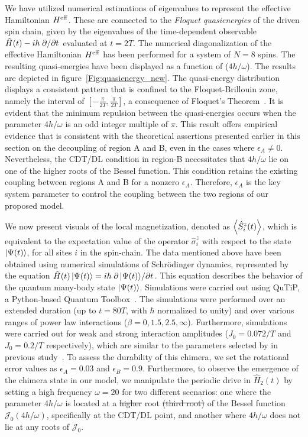 \documentclass[12pt]{iopart}
\begin{document}
We have utilized numerical estimations of eigenvalues to represent the effective Hamiltonian $H^{\rm eff}$. These are connected to the \textit{ Floquet quasienergies} of the driven spin chain, given by the eigenvalues of the time-dependent observable $\hat{H}(t)-i\hbar\pdv*{}{t}$ evaluated at $t=2T$. The numerical diagonalization of the effective Hamiltonian $H^{\rm eff}$ has been performed for a system of $N=8$ spins. The resulting quasi-energies have been displayed as a function of ($4h/\omega$). The results are depicted in figure~\ref{Fig:quasienergy_new}. The quasi-energy distribution displays a consistent pattern that is confined to the Floquet-Brillouin zone, namely the interval of $[-\frac{\pi}{2T}, \frac{\pi}{2T}]$, a consequence of Floquet's Theorem~\cite{dutta2014}. It is evident that the minimum repulsion between the quasi-energies occurs when the parameter $4h/\omega$ is an odd integer multiple of $\pi$. This result offers empirical evidence that is consistent with the theoretical assertions presented earlier in this section on the decoupling of region A and B, even in the cases where $\epsilon_A \neq 0$. Nevertheless, the CDT/DL condition in region-B necessitates that $4h/\omega$ lie on one of the higher roots of the Bessel function. This condition retains the existing coupling between regions A and B for a nonzero $\epsilon_A$. Therefore, $\epsilon_A$ is the key system parameter to control the coupling between the two regions of our proposed model. 	
	
We now present visuals of the local magnetization, denoted as $\expval{\hat{S}^z_i (t)}$, which is equivalent to the expectation value of the operator $\hat{\sigma}^z_i$ with respect to the state $\ket{\Psi(t)}$, for all sites $i$ in the spin-chain. The data mentioned above have been obtained using numerical simulations of Schr\"odinger dynamics, represented by the equation $\hat{H}(t)\ket{\Psi(t)}= i \hbar \pdv*{\ket{\Psi(t)}}{t}$. This equation describes the behavior of the quantum many-body state $\ket{\Psi(t)}$. Simulations were carried out using QuTiP, a Python-based Quantum Toolbox~\cite{Johansson2013}. The simulations were performed over an extended duration (up to $t = 80T$, with $\hbar$ normalized to unity) and over various ranges of power law interactions ($\beta = 0,1.5,2.5,\infty$). Furthermore, simulations were carried out for weak and strong interaction amplitudes ($J_0 = 0.072/T$ and $J_0 = 0.2/T$ respectively), which are similar to the parameters selected by in previous study~\cite{sakurai_phys_nodate,zhang_observation_2017}. To assess the durability of this chimera, we set the rotational error values as $\epsilon_A = 0.03$ and $\epsilon_B = 0.9$. Furthermore, to observe the emergence of the chimera state in our model, we manipulate the periodic drive in $\hat{H}_2(t)$ by setting a high frequency $\omega=20$ for two different scenarios: one where the parameter $4h/\omega$ is located at a \sout{higher} root \sout{(third root)} of the Bessel function $\mathcal{J}_0(4h/\omega)$, specifically at the CDT/DL point, and another where $4h/\omega$  does not lie at any roots of $\mathcal{J}_0$.
	
\end{document}
